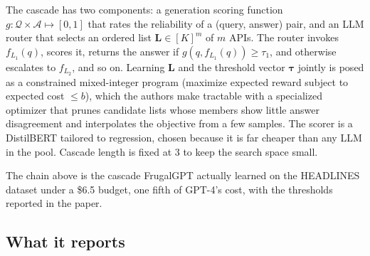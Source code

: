 The cascade has two components: a generation scoring function $g:\mathcal{Q}\times\mathcal{A}\mapsto[0,1]$ that rates the reliability of a (query, answer) pair, and an LLM router that selects an ordered list $\bm{L}\in[K]^m$ of $m$ APIs. The router invokes $f_{L_1}(q)$, scores it, returns the answer if $g(q,f_{L_1}(q))\ge\tau_1$, and otherwise escalates to $f_{L_2}$, and so on. Learning $\bm{L}$ and the threshold vector $\bm{\tau}$ jointly is posed as a constrained mixed-integer program (maximize expected reward subject to expected cost $\le b$), which the authors make tractable with a specialized optimizer that prunes candidate lists whose members show little answer disagreement and interpolates the objective from a few samples. The scorer is a DistilBERT tailored to regression, chosen because it is far cheaper than any LLM in the pool. Cascade length is fixed at 3 to keep the search space small.

\begin{center}
\end{center}

\noindent The chain above is the cascade FrugalGPT actually learned on the HEADLINES dataset under a \$6.5 budget, one fifth of GPT-4's cost, with the thresholds reported in the paper.

\subsection{What it reports}

